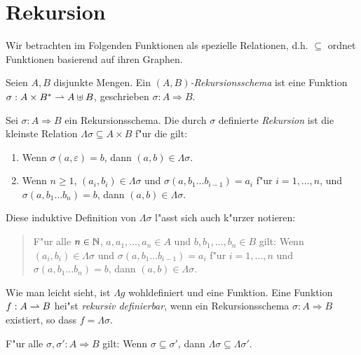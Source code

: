 \documentclass[12pt,a4paper]{article}
\begin{document}
\section{Rekursion}

Wir betrachten im Folgenden Funktionen als spezielle Relationen, d.h. $\subseteq$ ordnet
Funktionen basierend auf ihren Graphen.

\begin{definition}[Rekursionsschema]
  Seien $A,B$ disjunkte Mengen. Ein \emph{$(A,B)$-Rekursionsschema} ist eine Funktion
  $\sigma: A \times B^* \rightharpoonup A \uplus B$, geschrieben $\sigma: A \Rightarrow B$.
\end{definition}

\begin{definition}[Rekursion]
  Sei $\sigma: A \Rightarrow B$ ein Rekursionsschema. Die durch $\sigma$ definierte \emph{Rekursion}
  ist die kleinste Relation $\Lambda \sigma \subseteq A \times B$ f"ur die gilt:
  \begin{enumerate}
  \item Wenn $\sigma(a,\varepsilon) = b$, dann $(a,b) \in \Lambda \sigma$.
  \item Wenn $n \ge 1$, $(a_i,b_i) \in \Lambda \sigma$ und $\sigma(a,b_1 \ldots b_{i-1})=a_i$ f"ur $i=1,\ldots,n$,
    und $\sigma(a,b_1 \ldots b_n) = b$, dann $(a,b) \in \Lambda \sigma$.
  \end{enumerate}
\end{definition}
Diese induktive Definition von $\Lambda \sigma$ l"asst sich auch k"urzer notieren:
\begin{quote}
  F"ur alle $n \in \mathbb N$, $a, a_1,\ldots,a_n \in A$ und $b,b_1,\ldots,b_n\in B$ gilt: 
  Wenn $(a_i,b_i)\in\Lambda\sigma$ und $\sigma(a,b_1 \ldots b_{i-1}) = a_i$ f"ur $i = 1,\ldots,n$ und
  $\sigma(a,b_1 \ldots b_n) = b$, dann $(a,b)\in\Lambda \sigma$.
\end{quote}
Wie man leicht sieht, ist $\Lambda g$ wohldefiniert und eine Funktion.
Eine Funktion $f : A \rightharpoonup B$ hei"st \emph{rekursiv definierbar}, wenn ein Rekursions\-schema
$\sigma: A \Rightarrow B$ existiert, so dass $f = \Lambda \sigma$.

\begin{lemma}[Monotonie] \label{lemma:Monotonie}
  F"ur alle $\sigma,\sigma': A \Rightarrow B$ gilt:
  Wenn $\sigma \subseteq \sigma'$, dann $\Lambda \sigma \subseteq \Lambda \sigma'$.
\end{lemma}
\end{document}

